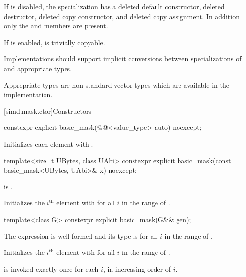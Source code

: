 If  is disabled, the specialization has a
deleted default constructor, deleted destructor, deleted copy constructor, and
deleted copy assignment.
In addition only the  and  members are
present.

If  is enabled,
 is trivially copyable.

\pnum
\recommended
Implementations should support implicit conversions between
specializations of  and appropriate  types.
\begin{note}
Appropriate types are non-standard vector types which are available in the
implementation.
\end{note}

[simd.mask.ctor]{Constructors}

\begin{itemdecl}
constexpr explicit basic_mask(@@<value_type> auto) noexcept;
\end{itemdecl}

\begin{itemdescr}
\pnum
\effects
Initializes each element with .
\end{itemdescr}

\begin{itemdecl}
template<size_t UBytes, class UAbi>
  constexpr explicit basic_mask(const basic_mask<UBytes, UAbi>& x) noexcept;
\end{itemdecl}

\begin{itemdescr}
\pnum
\constraints
{} is
.

\pnum
\effects
Initializes the $i^\text{th}$ element with  for all $i$ in the
range of .
\end{itemdescr}

\begin{itemdecl}
template<class G> constexpr explicit basic_mask(G&& gen);
\end{itemdecl}

\begin{itemdescr}
\pnum
\constraints
The expression  is
well-formed and its type is  for all $i$ in the range of
.

\pnum
\effects
Initializes the $i^\text{th}$ element with
 for all $i$ in
the range of .

\pnum
\remarks
{} is invoked exactly once for each $i$, in increasing order of $i$.
\end{itemdescr}

